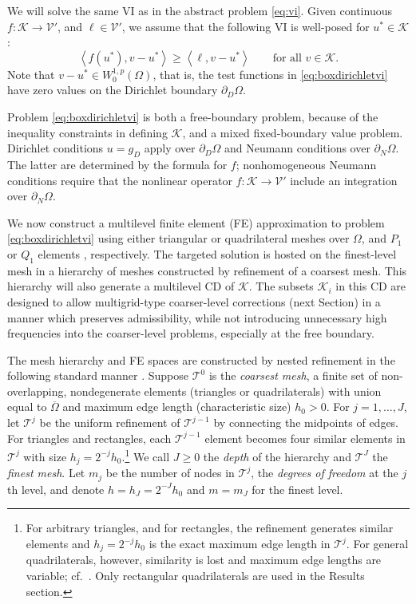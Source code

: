 \documentclass[letterpaper,final,12pt,reqno]{amsart}
\theoremstyle{cstyle}
\theoremstyle{cstyle*}
\theoremstyle{dstyle}
\numberwithin{equation}{section}
\numberwithin{figure}{section}
\numberwithin{table}{section}
\numberwithin{theorem}{section}
\newcommand{\cK}{\mathcal{K}}
\newcommand{\cV}{\mathcal{V}}
\newcommand{\ip}[2]{\left<#1,#2\right>}
\begin{document}
We will solve the same VI as in the abstract problem \eqref{eq:vi}.  Given continuous $f:\cK \to \cV'$, and $\ell \in \cV'$, we assume that the following VI is well-posed for $u^*\in \cK$:
\begin{equation}
\ip{f(u^*)}{v-u^*} \ge \ip{\ell}{v-u^*} \qquad \text{for all } v\in \cK. \label{eq:boxdirichletvi}
\end{equation}
Note that $v-u^* \in W_0^{1,p}(\Omega)$, that is, the test functions in \eqref{eq:boxdirichletvi} have zero values on the Dirichlet boundary $\partial_D\Omega$.

Problem \eqref{eq:boxdirichletvi} is both a free-boundary problem, because of the inequality constraints in defining $\cK$, and a mixed fixed-boundary value problem.   Dirichlet conditions $u=g_D$ apply over $\partial_D\Omega$ and Neumann conditions over $\partial_N \Omega$.  The latter are determined by the formula for $f$; nonhomogeneous Neumann conditions require that the nonlinear operator $f:\cK\to\cV'$ include an integration over $\partial_N\Omega$.

We now construct a multilevel finite element (FE) approximation to problem \eqref{eq:boxdirichletvi} using either triangular or quadrilateral meshes over $\Omega$, and $P_1$ or $Q_1$ elements \cite{Elmanetal2014}, respectively.  The targeted solution is hosted on the finest-level mesh in a hierarchy of meshes constructed by refinement of a coarsest mesh.   This hierarchy will also generate a multilevel CD of $\cK$.  The subsets $\cK_i$ in this CD are designed to allow multigrid-type coarser-level corrections (next Section) in a manner which preserves admissibility, while not introducing unnecessary high frequencies into the coarser-level problems, especially at the free boundary.

The mesh hierarchy and FE spaces are constructed by nested refinement in the following standard manner \cite{Elmanetal2014}.  Suppose $\mathcal{T}^0$ is the \emph{coarsest mesh}, a finite set of non-overlapping, nondegenerate elements (triangles or quadrilaterals) with union equal to $\overline{\Omega}$ and maximum edge length (characteristic size) $h_0>0$.  For $j=1,\dots,J$, let $\mathcal{T}^j$ be the uniform refinement of $\mathcal{T}^{j-1}$ by connecting the midpoints of edges.  For triangles and rectangles, each $\mathcal{T}^{j-1}$ element becomes four similar elements in $\mathcal{T}^j$ with size $h_j = 2^{-j} h_0$.\footnote{For arbitrary triangles, and for rectangles, the refinement generates similar elements and $h_j=2^{-j}h_0$ is the exact maximum edge length in $\mathcal{T}^j$.  For general quadrilaterals, however, similarity is lost and maximum edge lengths are variable; cf.~\cite{Zhang2004}.  Only rectangular quadrilaterals are used in the Results section.}  We call $J\ge 0$ the \emph{depth} of the hierarchy and $\mathcal{T}^J$ the \emph{finest mesh}.  Let $m_j$ be the number of nodes in $\mathcal{T}^j$, the \emph{degrees of freedom} at the $j$th level, and denote $h=h_J=2^{-J} h_0$ and $m=m_J$ for the finest level.
\end{document}
